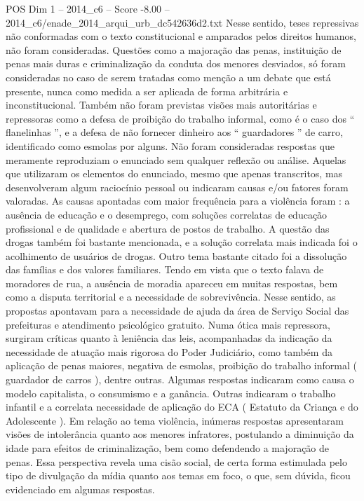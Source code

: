 \begin{textsample}{POS Dim 1 – 2014\_c6 – Score -8.00 – 2014\_c6/enade\_2014\_arqui\_urb\_dc542636d2.txt}
Nesse sentido, teses repressivas não conformadas com o texto constitucional e amparados pelos direitos humanos, não foram consideradas.
Questões como a majoração das penas, instituição de penas mais duras e criminalização da conduta dos menores desviados, só foram consideradas no caso de serem tratadas como menção a um debate que está presente, nunca como medida a ser aplicada de forma arbitrária e inconstitucional.
Também não foram previstas visões mais autoritárias e repressoras como a defesa de proibição do trabalho informal, como é o caso dos “ flanelinhas ”, e a defesa de não fornecer dinheiro aos “ guardadores ” de carro, identificado como esmolas por alguns.
Não foram consideradas respostas que meramente reproduziam o enunciado sem qualquer reflexão ou análise.
Aquelas que utilizaram os elementos do enunciado, mesmo que apenas transcritos, mas desenvolveram algum raciocínio pessoal ou indicaram causas e/ou fatores foram valoradas.
As causas apontadas com maior frequência para a violência foram : a ausência de educação e o desemprego, com soluções correlatas de educação profissional e de qualidade e abertura de postos de trabalho.
A questão das drogas também foi bastante mencionada, e a solução correlata mais indicada foi o acolhimento de usuários de drogas.
Outro tema bastante citado foi a dissolução das famílias e dos valores familiares.
Tendo em vista que o texto falava de moradores de rua, a ausência de moradia apareceu em muitas respostas, bem como a disputa territorial e a necessidade de sobrevivência.
Nesse sentido, as propostas apontavam para a necessidade de ajuda da área de Serviço Social das prefeituras e atendimento psicológico gratuito.
Numa ótica mais repressora, surgiram críticas quanto à leniência das leis, acompanhadas da indicação da necessidade de atuação mais rigorosa do Poder Judiciário, como também da aplicação de penas maiores, negativa de esmolas, proibição do trabalho informal ( guardador de carros ), dentre outras.
Algumas respostas indicaram como causa o modelo capitalista, o consumismo e a ganância.
Outras indicaram o trabalho infantil e a correlata necessidade de aplicação do ECA ( Estatuto da Criança e do Adolescente ).
Em relação ao tema violência, inúmeras respostas apresentaram visões de intolerância quanto aos menores infratores, postulando a diminuição da idade para efeitos de criminalização, bem como defendendo a majoração de penas.
Essa perspectiva revela uma cisão social, de certa forma estimulada pelo tipo de divulgação da mídia quanto aos temas em foco, o que, sem dúvida, ficou evidenciado em algumas respostas.

\end{textsample}
